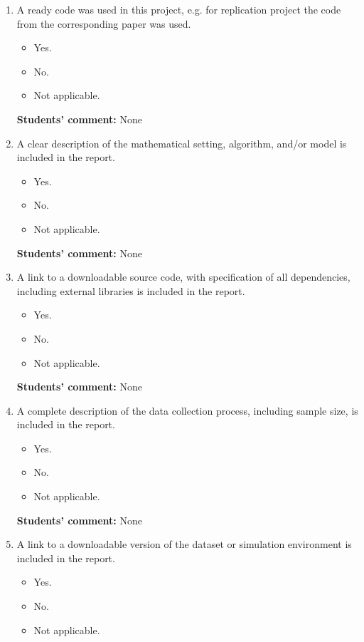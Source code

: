 \documentclass{article}
\begin{document}
    \begin{enumerate}
    \item A ready code was used in this project, e.g. for replication project the code from the corresponding paper was used.
    \begin{itemize}
        \item [\faSquareO] Yes.
        \item [\faCheckSquareO] No.
        \item [\faSquareO] Not applicable.
    \end{itemize}
    
    \textbf{Students' comment:} None
    \item A clear description of the mathematical setting, algorithm, and/or model is included in the report.
    \begin{itemize}
        \item [\faCheckSquareO] Yes.
        \item [\faSquareO] No.
        \item [\faSquareO] Not applicable.
    \end{itemize}
    
    \textbf{Students' comment:} None
    
    \item A link to a downloadable source code, with specification of all dependencies, including external libraries is included in the report.
    \begin{itemize}
        \item [\faCheckSquareO] Yes.
        \item [\faSquareO] No.
        \item [\faSquareO] Not applicable.
    \end{itemize}
    
    \textbf{Students' comment:} None
    
    \item A complete description of the data collection process, including sample size, is included in the report.
    \begin{itemize}
        \item [\faCheckSquareO] Yes.
        \item [\faSquareO] No.
        \item [\faSquareO] Not applicable.
    \end{itemize}
    
    \textbf{Students' comment:} None
    
    \item A link to a downloadable version of the dataset or simulation environment is included in the report.
    \begin{itemize}
        \item [\faSquareO] Yes.
        \item [\faCheckSquareO] No.
        \item [\faSquareO] Not applicable.
    \end{itemize}
    

\end{enumerate}
\end{document}
